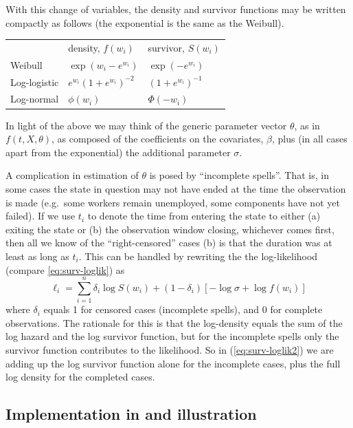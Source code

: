With this change of variables, the density and survivor functions may
be written compactly as follows (the exponential is the same as the
Weibull).

\begin{center}
\setlength\tabcolsep{1.5em}
\begin{tabular}{lll}
 & density, $f(w_i)$ & survivor, $S(w_i)$ \\ [4pt]
Weibull & 
$\exp\left(w_i - e^{w_i}\right)$ & $\exp(-e^{w_i})$
\\ [4pt]
Log-logistic & 
$e^{w_i} \left(1 + e^{w_i}\right)^{-2}$ 
& $\left(1 + e^{w_i}\right)^{-1}$ \\ [1ex]
Log-normal & $\phi(w_i)$ & $\Phi(-w_i)$
\end{tabular}
\end{center}

In light of the above we may think of the generic parameter vector
$\theta$, as in $f(t, X, \theta)$, as composed of the coefficients on
the covariates, $\beta$, plus (in all cases apart from the exponential)
the additional parameter $\sigma$.

A complication in estimation of $\theta$ is posed by ``incomplete
spells''. That is, in some cases the state in question may not have
ended at the time the observation is made (e.g.\ some workers remain
unemployed, some components have not yet failed).  If we use $t_i$ to
denote the time from entering the state to either (a) exiting the
state or (b) the observation window closing, whichever comes first,
then all we know of the ``right-censored'' cases (b) is that the
duration was at least as long as $t_i$. This can be handled by
rewriting the the log-likelihood (compare \ref{eq:surv-loglik}) as
\begin{equation}
\label{eq:surv-loglik2}
\ell_i = \sum_{i=1}^n \delta_i\log S\left(w_i\right)
+ \left(1-\delta_i\right) 
\left[-\log\sigma + \log f\left(w_i\right)\right]
\end{equation}
where $\delta_i$ equals 1 for censored cases (incomplete spells), and
0 for complete observations. The rationale for this is that the
log-density equals the sum of the log hazard and the log survivor
function, but for the incomplete spells only the survivor function
contributes to the likelihood. So in (\ref{eq:surv-loglik2}) we are
adding up the log survivor function alone for the incomplete cases,
plus the full log density for the completed cases.

\subsection{Implementation in  and illustration}

